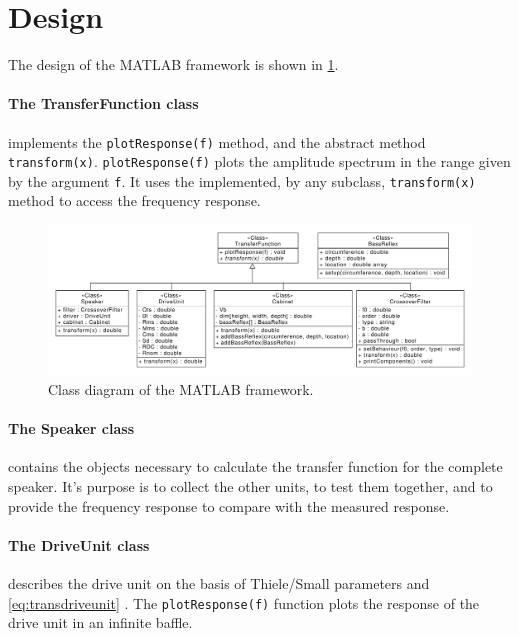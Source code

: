 \section{Design}
The design of the MATLAB framework is shown in \cref{fig:classbdd}.

\paragraph{The TransferFunction class} implements the \texttt{plotResponse(f)} method, and the  abstract method \texttt{transform(x)}.
\texttt{plotResponse(f)} plots the amplitude spectrum in the range given by the argument \texttt{f}.
It uses the implemented, by any subclass, \texttt{transform(x)} method to access the frequency response.

\begin{figure}
	\centering
	\includegraphics[width=\linewidth]{gfx/Design/Class_BDD}
	\caption{Class diagram of the MATLAB framework.}
	\label{fig:classbdd}
\end{figure}

\paragraph{The Speaker class} contains the objects necessary to calculate the transfer function for the complete speaker.
It's purpose is to collect the other units, to test them together, and to provide the frequency response to compare with the measured response.

\paragraph{The DriveUnit class} describes the drive unit on the basis of Thiele/Small parameters\cite{thielesmall} and \cref{eq:transdriveunit} \cite[p.~41]{Elektroakustik}.
The \texttt{plotResponse(f)} function plots the response of the drive unit in an infinite baffle.

